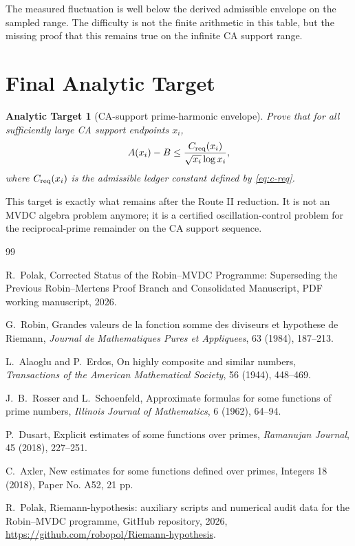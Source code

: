 \documentclass[11pt,a4paper]{article}
\newtheorem{target}{Analytic Target}
\begin{document}
The measured fluctuation is well below the derived admissible envelope on the
sampled range. The difficulty is not the finite arithmetic in this table, but
the missing proof that this remains true on the infinite CA support range.

\section{Final Analytic Target}

\begin{target}[CA-support prime-harmonic envelope]
Prove that for all sufficiently large CA support endpoints \(x_i\),
\[
  A(x_i)-B
  \le
  \frac{C_{\rm req}(x_i)}{\sqrt{x_i}\log x_i},
\]
where \(C_{\rm req}(x_i)\) is the admissible ledger constant defined by
\eqref{eq:c-req}.
\end{target}

This target is exactly what remains after the Route II reduction. It is not an
MVDC algebra problem anymore; it is a certified oscillation-control problem for
the reciprocal-prime remainder on the CA support sequence.

\begin{thebibliography}{99}

R.~Polak,
\newblock Corrected Status of the Robin--MVDC Programme:
Superseding the Previous Robin--Mertens Proof Branch and Consolidated Manuscript,
\newblock PDF working manuscript, 2026.

G.~Robin,
\newblock Grandes valeurs de la fonction somme des diviseurs et hypothese de Riemann,
\newblock \emph{Journal de Mathematiques Pures et Appliquees}, 63 (1984), 187--213.

L.~Alaoglu and P.~Erdos,
\newblock On highly composite and similar numbers,
\newblock \emph{Transactions of the American Mathematical Society}, 56 (1944), 448--469.

J.~B.~Rosser and L.~Schoenfeld,
\newblock Approximate formulas for some functions of prime numbers,
\newblock \emph{Illinois Journal of Mathematics}, 6 (1962), 64--94.

P.~Dusart,
\newblock Explicit estimates of some functions over primes,
\newblock \emph{Ramanujan Journal}, 45 (2018), 227--251.

C.~Axler,
\newblock New estimates for some functions defined over primes,
\newblock Integers 18 (2018), Paper No. A52, 21 pp.

R.~Polak,
\newblock Riemann-hypothesis: auxiliary scripts and numerical audit data for
the Robin--MVDC programme,
\newblock GitHub repository, 2026,
\newblock \url{https://github.com/robopol/Riemann-hypothesis}.

\end{thebibliography}
\end{document}
